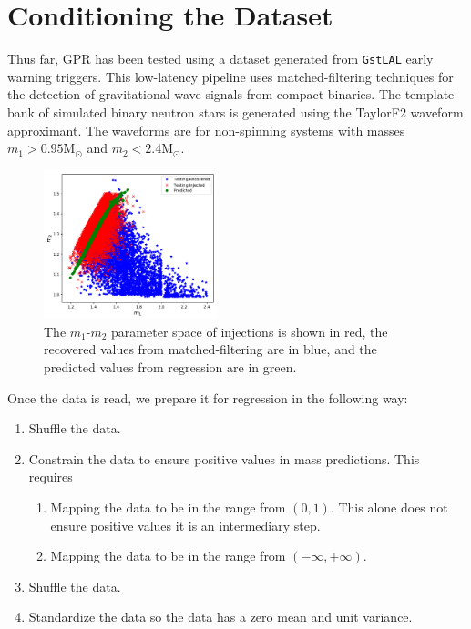 \documentclass[aps,prd,twocolumn,superscriptaddress,preprintnumbers,floatfix,nofootinbib]{revtex4-2}
\begin{document}
\section{Conditioning the Dataset}
Thus far, GPR has been tested using a dataset generated from \texttt{GstLAL} 
early warning triggers. This low-latency pipeline uses matched-filtering techniques 
for the detection of gravitational-wave signals from compact binaries. 
The template bank of simulated binary neutron stars is generated using the 
TaylorF2 waveform approximant. The waveforms are for non-spinning systems 
with masses $m_1 > 0.95 \mathrm{M}_{\odot}$ and $m_2 < 2.4 \mathrm{M}_{\odot}$.

\begin{figure}[h]
  \centering
  \includegraphics[width=0.45\textwidth]{m1m2_comparison}
  \caption{The $m_1$-$m_2$ parameter space of injections is shown in red, the recovered
  		values from matched-filtering are in blue, and the predicted values from 
		regression are in green.}
\end{figure}

Once the data is read, we prepare it for regression in the following way:
\begin{enumerate}[label=(\roman*)]
	\item Shuffle the data.
	\item Constrain the data to ensure positive values in mass predictions. This requires
	\begin{enumerate}
		\item Mapping the data to be in the range from $(0,1)$. This alone does not
			ensure positive values it is an intermediary step. 
		\item Mapping the data to be in the range from $(-\infty,+\infty)$.
	 \end{enumerate}
	\item Shuffle the data.
	\item Standardize the data so the data has a zero mean and unit variance.
\end{enumerate}
\end{document}
